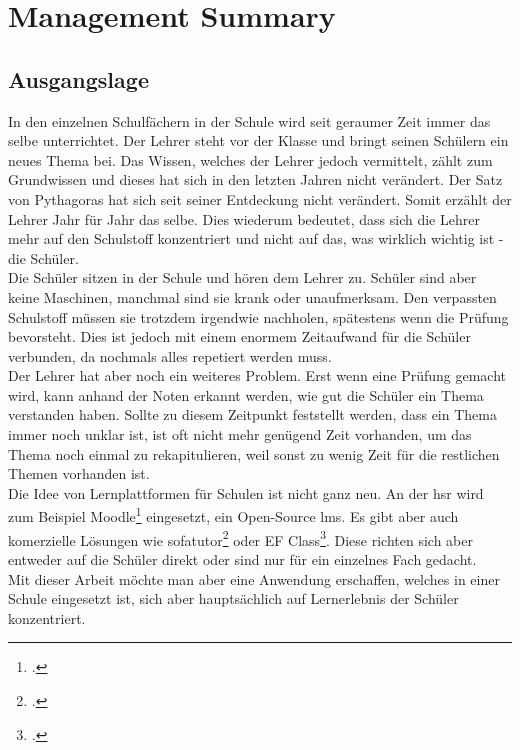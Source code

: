 \section{Management Summary}

\subsection{Ausgangslage}
In den einzelnen Schulfächern in der Schule wird seit geraumer Zeit immer das selbe unterrichtet. Der Lehrer steht vor der Klasse und bringt seinen Schülern ein neues Thema bei. Das Wissen, welches der Lehrer jedoch vermittelt, zählt zum Grundwissen und dieses hat sich in den letzten Jahren nicht verändert. Der Satz von Pythagoras hat sich seit seiner Entdeckung nicht verändert. Somit erzählt der Lehrer Jahr für Jahr das selbe. Dies wiederum bedeutet, dass sich die Lehrer mehr auf den Schulstoff konzentriert und nicht auf das, was wirklich wichtig ist - die Schüler. \\

Die Schüler sitzen in der Schule und hören dem Lehrer zu. Schüler sind aber keine Maschinen, manchmal sind sie krank oder unaufmerksam. Den verpassten Schulstoff müssen sie trotzdem irgendwie nachholen, spätestens wenn die Prüfung bevorsteht. Dies ist jedoch mit einem enormem Zeitaufwand für die Schüler verbunden, da nochmals alles repetiert werden muss. \\

Der Lehrer hat aber noch ein weiteres Problem. Erst wenn eine Prüfung gemacht wird, kann anhand der Noten erkannt werden, wie gut die Schüler ein Thema verstanden haben. Sollte zu diesem Zeitpunkt feststellt werden, dass ein Thema immer noch unklar ist, ist oft nicht mehr genügend Zeit vorhanden, um das Thema noch einmal zu rekapitulieren, weil sonst zu wenig Zeit für die restlichen Themen vorhanden ist. \\

Die Idee von Lernplattformen für Schulen ist nicht ganz neu. An der \gls{hsr} wird zum Beispiel Moodle\footcite{moodle_homepage} eingesetzt, ein Open-Source \gls{lms}. Es gibt aber auch komerzielle Lösungen wie sofatutor\footcite{sofatutor_homepage} oder EF Class\footcite{ef_class_homepage}. Diese richten sich aber entweder auf die Schüler direkt oder sind nur für ein einzelnes Fach gedacht. \\

Mit dieser Arbeit möchte man aber eine Anwendung erschaffen, welches in einer Schule eingesetzt ist, sich aber hauptsächlich auf Lernerlebnis der Schüler konzentriert. 

